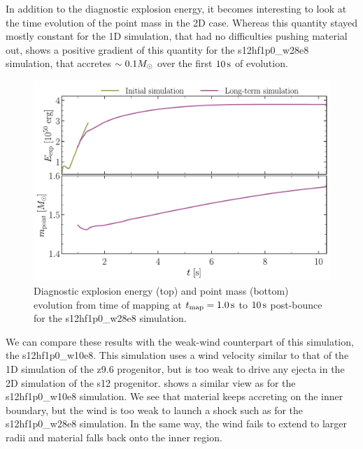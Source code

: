 \clearpage

In addition to the diagnostic explosion energy, it becomes interesting to look at the time evolution of the point mass in the 2D case. Whereas this quantity stayed mostly constant for the 1D simulation, that had no difficulties pushing material out,  shows a positive gradient of this quantity for the s12hf1p0\_w28e8 simulation, that accretes \(\sim0.1M_{\odot}\) over the first \(10\,\mathrm{s}\) of evolution.

\begin{figure}[ht!]
    \centering
    \includegraphics[width=0.9\linewidth]{figures/s12hf1p0_strong_quantities.pdf}
    \caption{Diagnostic explosion energy (top) and point mass (bottom) evolution from time of mapping at \(t_\mathrm{map} = 1.0 \,\mathrm{s}\) to \(10\,\mathrm{s}\) post-bounce for the s12hf1p0\_w28e8 simulation.}
    \label{fig:s12hf1p0_strong_quantities}
\end{figure}

We can compare these results with the weak-wind counterpart of this simulation, the s12hf1p0\_w10e8. This simulation uses a wind velocity similar to that of the 1D simulation of the z9.6 progenitor, but is too weak to drive any ejecta in the 2D simulation of the s12 progenitor.  shows a similar view as  for the s12hf1p0\_w10e8 simulation. We see that material keeps accreting on the inner boundary, but the wind is too weak to launch a shock such as for the s12hf1p0\_w28e8 simulation. In the same way, the wind fails to extend to larger radii and material falls back onto the inner region.

